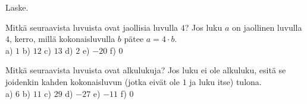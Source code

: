 \begin{tehtavasivu}
    \begin{tehtava}
        Laske.
        \begin{alakohdat}
        \end{alakohdat}

        \begin{vastaus}
            \begin{alakohdat}
            \end{alakohdat}
        \end{vastaus}
    \end{tehtava}

    \begin{tehtava}
    Mitkä seuraavista luvuista ovat jaollisia luvulla $4$? Jos luku $a$ on jaollinen luvulla $4$, kerro, millä kokonaisluvulla $b$ pätee $a = 4 \cdot b$.\\
    a) $1$ \quad b) $12$  \quad c) $13$ \quad d) $2$ \quad e) $-20$ \quad f) $0$
    
    \begin{vastaus}
    \begin{alakohdat}
    \end{alakohdat}
    \end{vastaus}
    \end{tehtava}
    
    \begin{tehtava}
      Mitkä seuraavista luvuista ovat alkulukuja? Jos luku ei ole alkuluku, esitä se joidenkin kahden kokonaisluvun (jotka eivät ole $1$ ja luku itse) tulona.\\
    a) $6$ \quad b) $11$ \quad c) $29$ \quad d) $-27$ \quad e) $-11$ \quad f) $0$ 
    
    \begin{vastaus}
    \begin{alakohdat}
    \end{alakohdat}
    \end{vastaus}
    \end{tehtava}
    

\end{tehtavasivu}

